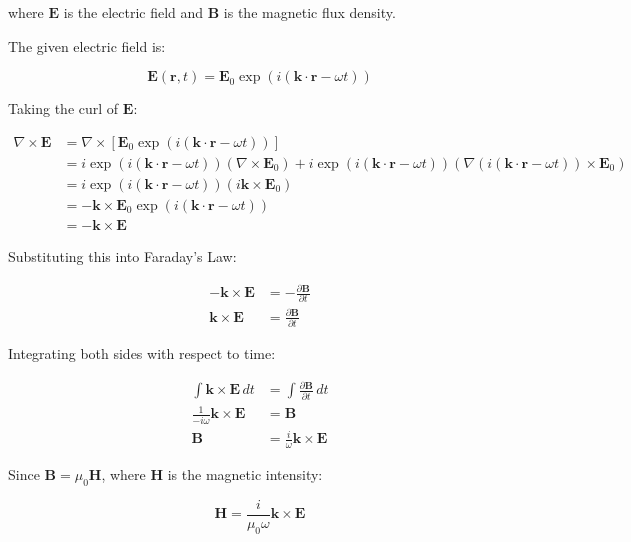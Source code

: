 \documentclass{article}
\begin{document}
where $\mathbf{E}$ is the electric field and $\mathbf{B}$ is the magnetic flux density.  

The given electric field is:

\begin{equation*}
\mathbf{E}(\mathbf{r}, t) = \mathbf{E}_0 \exp(i (\mathbf{k} \cdot \mathbf{r} - \omega t))
\end{equation*}

Taking the curl of $\mathbf{E}$:

\begin{align*}
\nabla \times \mathbf{E} &= \nabla \times [\mathbf{E}_0 \exp(i (\mathbf{k} \cdot \mathbf{r} - \omega t))] \\
&= i \exp(i (\mathbf{k} \cdot \mathbf{r} - \omega t)) (\nabla \times \mathbf{E}_0) + i \exp(i (\mathbf{k} \cdot \mathbf{r} - \omega t)) (\nabla (i (\mathbf{k} \cdot \mathbf{r} - \omega t)) \times \mathbf{E}_0) \\
&= i \exp(i (\mathbf{k} \cdot \mathbf{r} - \omega t)) (i \mathbf{k} \times \mathbf{E}_0) \\
&= - \mathbf{k} \times \mathbf{E}_0 \exp(i (\mathbf{k} \cdot \mathbf{r} - \omega t)) \\
&= - \mathbf{k} \times \mathbf{E}
\end{align*}

Substituting this into Faraday's Law:

\begin{align*}
- \mathbf{k} \times \mathbf{E} &= -\frac{\partial \mathbf{B}}{\partial t} \\
\mathbf{k} \times \mathbf{E} &= \frac{\partial \mathbf{B}}{\partial t}
\end{align*}

Integrating both sides with respect to time:

\begin{align*}
\int \mathbf{k} \times \mathbf{E} \, dt &= \int \frac{\partial \mathbf{B}}{\partial t} \, dt \\
\frac{1}{-i \omega} \mathbf{k} \times \mathbf{E} &= \mathbf{B} \\
\mathbf{B} &= \frac{i}{\omega} \mathbf{k} \times \mathbf{E}
\end{align*}

Since $\mathbf{B} = \mu_0 \mathbf{H}$, where $\mathbf{H}$ is the magnetic intensity:

\begin{equation*}
\mathbf{H} = \frac{i}{\mu_0 \omega} \mathbf{k} \times \mathbf{E}
\end{equation*}
\end{document}
